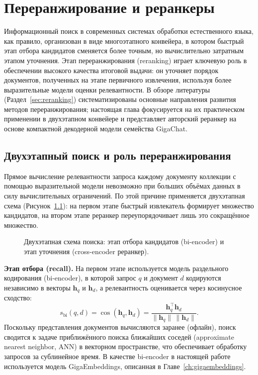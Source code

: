 \chapter{Переранжирование и реранкеры}\label{ch:reranking}

Информационный поиск в современных системах обработки естественного языка, как правило, организован в виде многоэтапного конвейера, в котором быстрый этап отбора кандидатов сменяется более точным, но вычислительно затратным этапом уточнения.
Этап переранжирования (reranking) играет ключевую роль в обеспечении высокого качества итоговой выдачи: он уточняет порядок документов, полученных на этапе первичного извлечения, используя более выразительные модели оценки релевантности.
В обзоре литературы (Раздел~\ref{sec:reranking}) систематизированы основные направления развития методов переранжирования; настоящая глава фокусируется на их практическом применении в двухэтапном конвейере и представляет авторский реранкер на основе компактной декодерной модели семейства GigaChat.

\section{Двухэтапный поиск и роль переранжирования}\label{sec:rr_two_stage}

Прямое вычисление релевантности запроса каждому документу коллекции с помощью выразительной модели невозможно при больших объёмах данных в силу вычислительных ограничений.
По этой причине применяется двухэтапная схема (Рисунок~\ref{fig:two_stage_retrieval}): на первом этапе быстрый извлекатель формирует множество кандидатов, на втором этапе реранкер переупорядочивает лишь это сокращённое множество.

\begin{figure}[htbp]
    \centering
    \resizebox{0.95\textwidth}{!}{
        
    }
    \caption{Двухэтапная схема поиска: этап отбора кандидатов (bi-encoder) и этап уточнения (cross-encoder реранкер).}
    \label{fig:two_stage_retrieval}
\end{figure}

\textbf{Этап отбора (recall).} На первом этапе используется модель раздельного кодирования (bi-encoder), в которой запрос $q$ и документ $d$ кодируются независимо в векторы $\mathbf{h}_q$ и $\mathbf{h}_d$, а релевантность оценивается через косинусное сходство:
\begin{equation}
\label{eq:rr_biencoder}
    s_{\text{bi}}(q, d) = \cos(\mathbf{h}_q, \mathbf{h}_d) = \frac{\mathbf{h}_q^\top \mathbf{h}_d}{\|\mathbf{h}_q\|\,\|\mathbf{h}_d\|}.
\end{equation}
Поскольку представления документов вычисляются заранее (офлайн), поиск сводится к задаче приближённого поиска ближайших соседей (approximate nearest neighbor, ANN) в векторном пространстве, что обеспечивает обработку запросов за сублинейное время.
В качестве bi-encoder в настоящей работе используется модель GigaEmbeddings, описанная в Главе~\ref{ch:gigaembeddings}.

